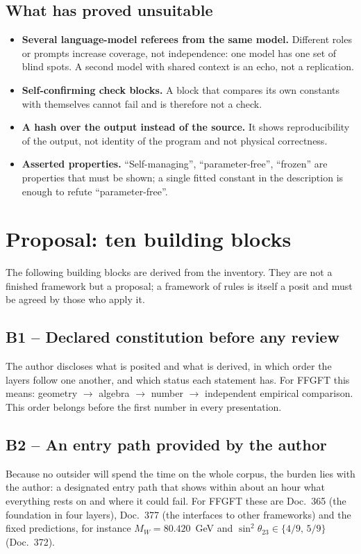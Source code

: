 \subsection{What has proved unsuitable}

\begin{itemize}
\item \textbf{Several language-model referees from the same model.} Different roles or prompts
  increase coverage, not independence: one model has one set of blind spots. A second model
  with shared context is an echo, not a replication.
\item \textbf{Self-confirming check blocks.} A block that compares its own constants with
  themselves cannot fail and is therefore not a check.
\item \textbf{A hash over the output instead of the source.} It shows reproducibility of the
  output, not identity of the program and not physical correctness.
\item \textbf{Asserted properties.} ``Self-managing'', ``parameter-free'', ``frozen'' are
  properties that must be shown; a single fitted constant in the description is enough to
  refute ``parameter-free''.
\end{itemize}

\section{Proposal: ten building blocks}

The following building blocks are derived from the inventory. They are not a finished
framework but a proposal; a framework of rules is itself a posit and must be agreed by
those who apply it.

\subsection*{B1 -- Declared constitution before any review}
The author discloses what is posited and what is derived, in which order the layers
follow one another, and which status each statement has. For FFGFT this means: geometry
$\to$ algebra $\to$ number $\to$ independent empirical comparison. This order belongs
before the first number in every presentation.

\subsection*{B2 -- An entry path provided by the author}
Because no outsider will spend the time on the whole corpus, the burden lies with the
author: a designated entry path that shows within about an hour what everything rests on
and where it could fail. For FFGFT these are Doc.~365 (the foundation in four layers),
Doc.~377 (the interfaces to other frameworks) and the fixed predictions, for instance
$M_W=80.420$~GeV and $\sin^2\theta_{23}\in\{4/9,\,5/9\}$ (Doc.~372).

